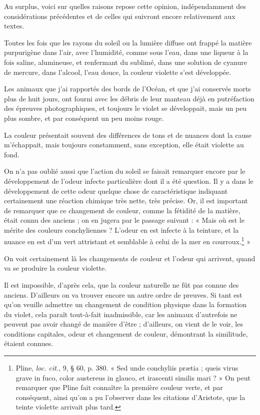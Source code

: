 \documentclass[a4paper, 11pt, oneside, polutonikogreek, french]{article}
\begin{document}
Au surplus, voici sur quelles raisons repose cette opinion, indépendamment des considérations précédentes et de celles qui suivront encore relativement aux textes.

Toutes les fois que les rayons du soleil ou la lumière diffuse ont frappé la matière purpurigène dans l'air, avec l'humidité, comme sous l'eau, dans une liqueur à la fois saline, alumineuse, et renfermant du sublimé, dans une solution de cyanure de mercure, dans l'alcool, l'eau douce, la couleur violette s'est développée.

Les animaux que j'ai rapportés des bords de l'Océan, et que j'ai conservés morts plus de huit jours, ont fourni avec les débris de leur manteau déjà en putréfaction des épreuves photographiques, et toujours le violet se développait, mais un peu plus sombre, et par conséquent un peu moins rouge.

La couleur présentait souvent des différences de tons et de nuances dont la cause m'échappait, mais toujours constamment, sans exception, elle était violette au fond.

On n'a pas oublié aussi que l'action du soleil se faisait remarquer encore par le développement de l'odeur infecte particulière dont il a été question. Il y a dans le développement de cette odeur quelque chose de caractéristique indiquant certainement une réaction chimique très nette, très précise. Or, il est important de remarquer que ce changement de couleur, comme la fétidité de la matière, était connu des anciens ; on en jugera par le passage suivant : « Mais où est le mérite des couleurs conchyliennes ? L'odeur en est infecte à la teinture, et la nuance en est d'un vert attristant et semblable à celui de la mer en courroux.\footnote{Pline, \emph{loc. cit.}, 9, § 60, p. 380. « Sed unde conchyliis prætia ; queis virus grave in fuco, color austereus in glauco, et irascenti similis mari ? » On peut remarquer que Pline fait connaître la première couleur verte, et par conséquent, ainsi qu'on a pu l'observer dans les citations d'Aristote, que la teinte violette arrivait plus tard.} »

On voit certainement là les changements de couleur et l'odeur qui arrivent, quand va se produire la couleur violette.

Il est impossible, d'après cela, que la couleur naturelle ne fût pas connue des anciens. D'ailleurs on va trouver encore un autre ordre de preuves. Si tant est qu'on veuille admettre un changement de condition physique dans la formation du violet, cela paraît tout-à-fait inadmissible, car les animaux d'autrefois ne peuvent pas avoir changé de manière d'être ; d'ailleurs, on vient de le voir, les conditions capitales, odeur et changement de couleur, démontrant la similitude, étaient connues.
\end{document}
